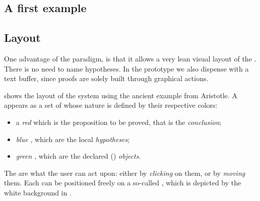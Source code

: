 \begin{scope}

\section{A first example}

\subsection{Layout}
One advantage of the  paradigm, is that it allows a very lean visual layout
of the . There is no need to name hypotheses. In the prototype we
also dispense with a text buffer, since proofs are solely built through
graphical actions.


\AP
{} shows the layout of the system using the ancient example from
Aristotle. A  appears as a set of  whose nature is defined
by their respective colors:
\begin{itemize}
  \item a \emph{red } which is the proposition to be proved, that is the
   \emph{conclusion};
  \item \emph{blue }, which are the local \emph{hypotheses};
  \item \emph{green }, which are the declared ()
  \emph{objects}.
\end{itemize}

The  are what the user can act upon: either by {\em clicking} on them, or
by {\em moving} them. Each  can be positioned freely on a so-called
, which is depicted by the white background in
.


\end{scope}
